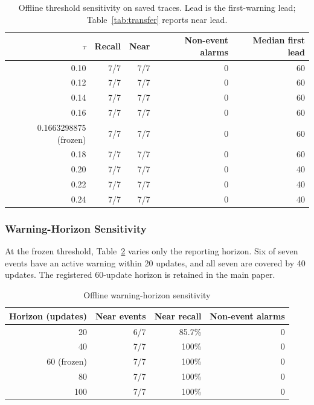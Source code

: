 \begin{table}[h]
\centering
\caption{Offline threshold sensitivity on saved traces. Lead is the first-warning
lead; Table~\ref{tab:transfer} reports near lead.}
\label{tab:tau-sensitivity}
\scriptsize
\setlength{\tabcolsep}{3pt}
\begin{tabular}{rrrrr}
\toprule
$\tau$ & Recall & Near & Non-event alarms & Median first lead \\
\midrule
0.10 & 7/7 & 7/7 & 0 & 60 \\
0.12 & 7/7 & 7/7 & 0 & 60 \\
0.14 & 7/7 & 7/7 & 0 & 60 \\
0.16 & 7/7 & 7/7 & 0 & 60 \\
0.1663298875 (frozen) & 7/7 & 7/7 & 0 & 60 \\
0.18 & 7/7 & 7/7 & 0 & 60 \\
0.20 & 7/7 & 7/7 & 0 & 40 \\
0.22 & 7/7 & 7/7 & 0 & 40 \\
0.24 & 7/7 & 7/7 & 0 & 40 \\
\bottomrule
\end{tabular}
\end{table}

\subsubsection{Warning-Horizon Sensitivity}
At the frozen threshold, Table~\ref{tab:horizon-sensitivity} varies only the
reporting horizon. Six of seven events have an active warning within 20
updates, and all seven are covered by 40 updates. The registered 60-update
horizon is retained in the main paper.

\begin{table}[h]
\centering
\caption{Offline warning-horizon sensitivity}
\label{tab:horizon-sensitivity}
\scriptsize
\setlength{\tabcolsep}{6pt}
\begin{tabular}{rrrr}
\toprule
Horizon (updates) & Near events & Near recall & Non-event alarms \\
\midrule
20  & 6/7 & 85.7\% & 0 \\
40  & 7/7 & 100\% & 0 \\
60 (frozen) & 7/7 & 100\% & 0 \\
80  & 7/7 & 100\% & 0 \\
100 & 7/7 & 100\% & 0 \\
\bottomrule
\end{tabular}
\end{table}

